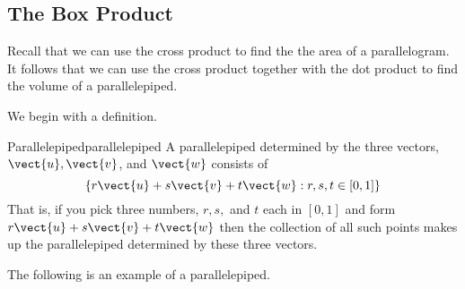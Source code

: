 \subsection{The Box Product}

Recall that we can use the cross product to find the the area of a parallelogram. It follows that we can use the 
cross product together with the dot product to find the volume of a parallelepiped.

We begin with a definition.

\begin{definition}{Parallelepiped}{parallelepiped}
A parallelepiped
 determined by the three vectors, $\vect{u},\vect{v}$, and $\vect{w}$ consists of
\begin{equation*}
\left\{ r\vect{u}+s\vect{v}+t\vect{w}:r,s,t\in \left[ 0,1\right]
\right\} 
\end{equation*}
That is, if you pick three numbers, $r,s,$ and $t$ each in $\left[ 0,1\right]
$ and form $r\vect{u}+s\vect{v}+t\vect{w}$ then the collection of all
such points makes up the parallelepiped
determined by these three vectors.
\end{definition}

The following is an example of a parallelepiped.

\begin{center}
\end{center}

